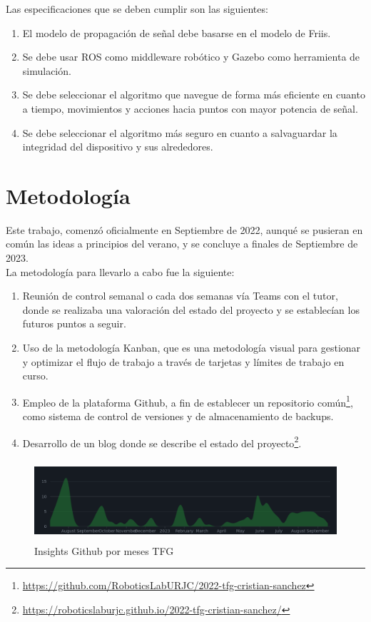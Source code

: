 Las especificaciones que se deben cumplir son las siguientes:

\begin{enumerate}
	\item El modelo de propagación de señal debe basarse en el modelo de Friis.
	\item Se debe usar \ac{ROS} como middleware robótico y Gazebo como herramienta de simulación.
	\item Se debe seleccionar el algoritmo que navegue de forma más eficiente en cuanto a tiempo, movimientos y acciones hacia puntos con mayor potencia de señal.
	\item Se debe seleccionar el algoritmo más seguro en cuanto a salvaguardar la integridad del dispositivo y sus alrededores.
\end{enumerate}

\section{Metodología}
\label{sec:metodologia}

Este trabajo, comenzó oficialmente en Septiembre de 2022, aunqué se pusieran en común las ideas a principios del verano, y se concluye a finales de Septiembre de 2023.\\ 

La metodología para llevarlo a cabo fue la siguiente:

\begin{enumerate}
	\item Reunión de control semanal o cada dos semanas vía Teams con el tutor, donde se realizaba una valoración del estado del proyecto y se establecían los futuros puntos a seguir.
	\item Uso de la metodología Kanban, que es una metodología visual para gestionar y optimizar el flujo de trabajo a través de tarjetas y límites de trabajo en curso.
	\item Empleo de la plataforma Github, a fin de establecer un repositorio común\footnote[1]{\url{https://github.com/RoboticsLabURJC/2022-tfg-cristian-sanchez}}, como sistema de control de versiones y de almacenamiento de backups.
	\item Desarrollo de un blog donde se describe el estado del proyecto\footnote[2]{\url{https://roboticslaburjc.github.io/2022-tfg-cristian-sanchez/}}.
\end{enumerate}

\begin{figure} [H]
	\begin{center}
	\includegraphics[height=3cm]{imagenes/cap2/1_insights.png}
	\end{center}
	\caption[Insights Github por meses \ac{TFG}]{Insights Github por meses \ac{TFG}}
	\label{fig:insights}
\end{figure}

